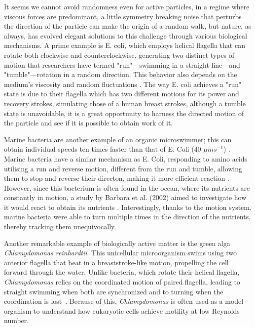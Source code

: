 It seems we cannot avoid randomness even for active particles, in a regime where viscous forces are predominant, a little symmetry breaking noise that perturbs the direction of the particle can make the origin of a random walk, but nature, as always, has evolved elegant solutions to this challenge through various biological mechanisms. A prime example is E. coli, which employs helical flagella that can rotate both clockwise and counterclockwise, generating two distinct types of motion that researchers have termed "run"—swimming in a straight line—and "tumble"—rotation in a random direction. This behavior also depends on the medium's viscosity and random fluctuations \cite{kumar2010physics}. The way E. coli achieves a "run" state is due to their flagella which has two different motions for its power and recovery strokes, simulating those of a human breast strokes, although a tumble state is unavoidable, it is a great opportunity to harness the directed motion of the particle and see if it is possible to obtain work of it. 


Marine bacteria are another example of an organic microswimmer; this can obtain individual speeds ten times faster than that of E. Coli (40 $\mu m s^{-1}$) \cite{mitchell1995long, lowe1987rapid}. Marine bacteria have a similar mechanism as E. Coli, responding to amino acids utilising a run and reverse motion, different from the run and tumble, allowing them to stop and reverse their directon, making it more efficient reaction \cite{barbara2003marine}. However, since this bacterium is often found in the ocean, where its nutrients are constantly in motion, a study by Barbara et al. (2002) aimed to investigate how it would react to obtain its nutrients \cite{barbara2003bacterial}. Interestingly, thanks to the motion system, marine bacteria were able to turn multiple times in the direction of the nutrients, thereby tracking them unequivocally.

Another remarkable example of biologically active matter is the green alga \textit{Chlamydomonas reinhardtii}. This unicellular microorganism swims using two anterior flagella that beat in a breaststroke-like motion, propelling the cell forward through the water. Unlike bacteria, which rotate their helical flagella, \textit{Chlamydomonas} relies on the coordinated motion of paired flagella, leading to straight swimming when both are synchronized and to turning when the coordination is lost~\cite{goldstein2015green}. Because of this, \textit{Chlamydomonas} is often used as a model organism to understand how eukaryotic cells achieve motility at low Reynolds number.

